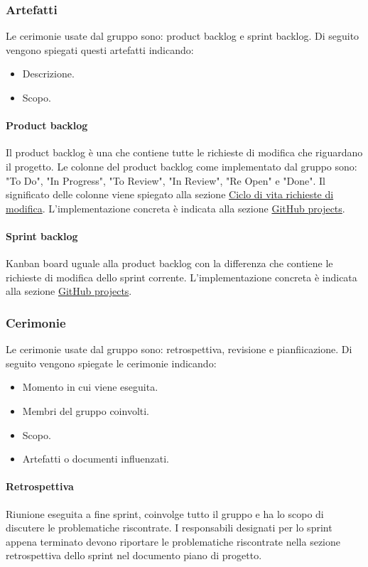 \subsubsection{Artefatti}
Le cerimonie usate dal gruppo sono: product backlog e sprint backlog. 
Di seguito vengono spiegati questi artefatti indicando:
\begin{itemize}
    \item Descrizione.
    \item Scopo.
\end{itemize}

\paragraph{Product backlog}
Il product backlog è una  che contiene tutte le richieste di modifica che riguardano il progetto.
Le colonne del product backlog come implementato dal gruppo sono: "To Do", "In Progress", "To Review", "In Review", "Re Open" e "Done".
Il significato delle colonne viene spiegato alla sezione \hyperref[par:ciclo_vita_richieste_di_modifica]{Ciclo di vita richieste di modifica}.
L'implementazione concreta è indicata alla sezione \hyperref[subpar:project]{GitHub projects}.

\paragraph{Sprint backlog}
Kanban board uguale alla product backlog con la differenza che contiene le richieste di modifica dello sprint corrente.
L'implementazione concreta è indicata alla sezione \hyperref[subpar:project]{GitHub projects}.

\subsubsection{Cerimonie}
Le cerimonie usate dal gruppo sono: retrospettiva, revisione e pianfiicazione. 
Di seguito vengono spiegate le cerimonie indicando:
\begin{itemize}
    \item Momento in cui viene eseguita.
    \item Membri del gruppo coinvolti.
    \item Scopo.
    \item Artefatti o documenti influenzati.
\end{itemize}

\paragraph{Retrospettiva}
Riunione eseguita a fine sprint, coinvolge tutto il gruppo e ha lo scopo di discutere le problematiche riscontrate.
I responsabili designati per lo sprint appena terminato devono riportare le problematiche riscontrate nella sezione retrospettiva dello sprint nel documento piano di progetto.


